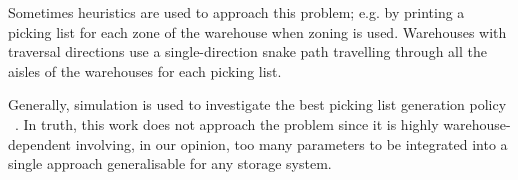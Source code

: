 Sometimes heuristics are used to approach this problem; e.g. by printing a picking list for each zone of the warehouse when zoning is used. Warehouses with traversal directions use a single-direction snake path travelling through all the aisles of the warehouses for each picking list.\par

Generally, simulation is used to investigate the best picking list generation policy ~\cite{Chew1999, Hall1993, Kim2002, Petersen1999}. In truth, this work does not approach the problem since it is highly warehouse-dependent involving, in our opinion, too many parameters to be integrated into a single approach generalisable for any storage system.






